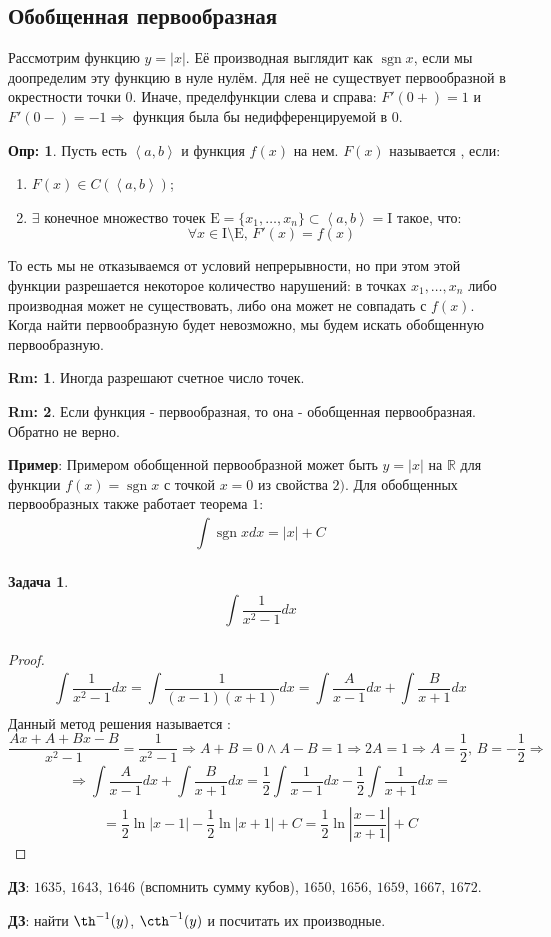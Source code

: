 \documentclass[12pt]{article}
\newcommand{\MR}{\mathbb{R}}
\newcommand{\MI}{\mathrm{I}}
\theoremstyle{definition}
\newtheorem{defn}{Опр:}
\newtheorem{rem}{Rm:}
\newtheorem{problem}{Задача}
\DeclareMathOperator{\sgn}{sgn}
\newcommand{\ddint}[2]{\displaystyle\int\limits_{#1}^{#2}}
\newcommand{\inner}[2]{\left\langle #1, #2 \right\rangle }
\begin{document}
\subsection*{Обобщенная первообразная}
Рассмотрим функцию $y = |x|$. Её производная выглядит как $\sgn{x}$, если мы доопределим эту функцию в нуле нулём. Для неё не существует первообразной в окрестности точки $0$. Иначе, пределфункции слева и справа: $F'(0+)= 1$ и $F'(0-) = -1 \Rightarrow$ функция была бы недифференцируемой в $0$. 

\begin{defn}
	Пусть есть $\inner{a}{b}$ и функция $f(x)$ на нем. $F(x)$ называется , если:
	\begin{enumerate}[label=\arabic*)]
		\item $F(x) \in C(\inner{a}{b})$;
		\item $\exists$ конечное множество точек $\mathrm{E} = \{x_1,\dotsc, x_n\} \subset \inner{a}{b} = \MI$ такое, что:
		$$
			\forall x \in \MI \setminus \mathrm{E}, \, F'(x) = f(x)
		$$
	\end{enumerate}
\end{defn}
То есть мы не отказываемся от условий непрерывности, но при этом этой функции разрешается некоторое количество нарушений: в точках $x_1, \dotsc, x_n$ либо производная может не существовать, либо она может не совпадать с $f(x)$. Когда найти первообразную будет невозможно, мы будем искать обобщенную первообразную.
\begin{rem}
	Иногда разрешают счетное число точек.
\end{rem}
\begin{rem}
	Если функция - первообразная, то она - обобщенная первообразная. Обратно не верно.
\end{rem}

\textbf{Пример}: Примером обобщенной первообразной может быть $y = |x|$ на $\MR$ для функции $f(x) = \sgn{x}$ с точкой $x = 0$  из свойства $2)$. Для обобщенных первообразных также работает теорема $1$:
$$
	\ddint{}{}\sgn{x}dx = |x| + C
$$

\begin{problem}
	$$
		\ddint{}{}\dfrac{1}{x^2 - 1}dx 
	$$
\end{problem}
\begin{proof}
	$$
		\ddint{}{}\dfrac{1}{x^2 - 1}dx= \ddint{}{}\dfrac{1}{(x-1)(x+1)}dx = \ddint{}{}\dfrac{A}{x-1}dx + \ddint{}{}\dfrac{B}{x +1}dx
	$$
	Данный метод решения называется :
	$$
		\dfrac{Ax + A + Bx -B}{x^2 -1} = \dfrac{1}{x^2 -1} \Rightarrow A + B = 0 \wedge A - B = 1 \Rightarrow 2A = 1 \Rightarrow A = \dfrac{1}{2}, \, B = -\dfrac{1}{2} \Rightarrow
	$$
	$$
		\Rightarrow \ddint{}{}\dfrac{A}{x-1}dx + \ddint{}{}\dfrac{B}{x +1}dx = \dfrac{1}{2}\ddint{}{}\dfrac{1}{x-1}dx - \dfrac{1}{2}\ddint{}{}\dfrac{1}{x+1}dx =
	$$
	$$
		= \dfrac{1}{2}\ln{|x-1|} - \dfrac{1}{2}\ln{|x+1|} + C = \dfrac{1}{2}\ln{\left|\dfrac{x-1}{x+1}\right|} + C
	$$
\end{proof}

\textbf{ДЗ}: $1635$, $1643$, $1646$ (вспомнить сумму кубов), $1650$, $1656$, $1659$, $1667$, $1672$.

\textbf{ДЗ}: найти $\th^{-1}(y)$, $\cth^{-1}(y)$ и посчитать их производные. 
\end{document}
